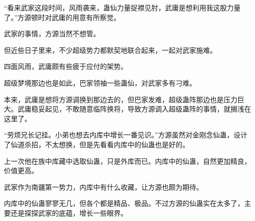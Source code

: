 \begin{this_body}
“看来武家这段时间，风雨袭来，蛊仙力量捉襟见肘，武庸是想利用我这股力量了。”方源顿时对武庸的用意有所察觉。

武家的事情，方源当然不想管。

但近些日子里来，不少超级势力都默契地联合起来，一起对武家施难。

四面风雨，武庸颇有些疲于应付的架势。

超级梦境那边也是如此，巴家领袖一些蛊仙，对武家多有刁难。

本来，武庸是想将方源调换到那边去的，但巴家发难，超级蛊阵那边也是压力巨大。武庸稳妥起见，不敢随意临阵换将，导致方源调入超级蛊阵的事情，就搁浅在这里了。

“劳烦兄长记挂。小弟也想去内库中增长一番见识。”方源虽然对金刚念仙蛊，设计了仙道杀招，不太想换，但是先看看内库中的仙蛊也是好的。

上一次他在族中库藏中选取仙蛊，只是外库而已。内库中的仙蛊，自然更加精良，价值更高。

武家作为南疆第一势力，内库中有什么收藏，让方源也颇为期待。

内库中的仙蛊寥寥无几，但各个都是精品、极品。不过方源的仙蛊实在太多了，主要还是探探武家的底蕴，增长一些眼界。

\end{this_body}

